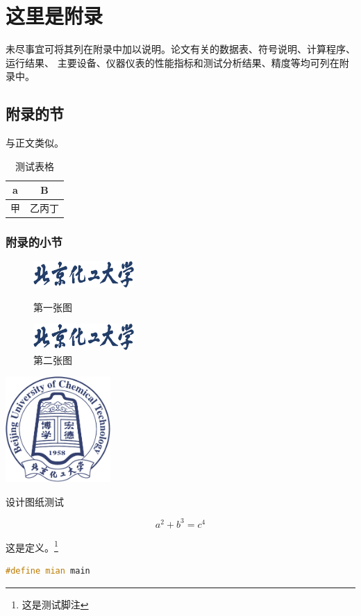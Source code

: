\chapter{这里是附录}\label{app:1}
未尽事宜可将其列在附录中加以说明。论文有关的数据表、符号说明、计算程序、运行结果、
主要设备、仪器仪表的性能指标和测试分析结果、精度等均可列在附录中。
\section{附录的节}
与正文类似。
\begin{table}[ht]
	\centering
	\caption{测试表格}\label{tab:mytable}
	\begin{tabular}{cc}
		\toprule
		a & B   \\
		\midrule
		甲   & 乙丙丁 \\
		\bottomrule
	\end{tabular}
\end{table}

\subsection{附录的小节}
\zhlipsum[1][name = zhufu]

\begin{figure}[ht]
	\centering
	\begin{minipage}{0.3\textwidth}
		\centering
		\includegraphics[height=1cm]{figure/ZNName.png}
		\caption{第一张图}\label{fig:test1}
	\end{minipage}
	\hspace{2cm}
	\begin{minipage}{0.3\textwidth}
		\centering
		\includegraphics[height=1cm]{figure/ZNName.png}
		\caption{第二张图}\label{fig:test2}
	\end{minipage}
\end{figure}

\zhlipsum[name = xiangyu]

\begin{dfigure}[tbp]
	\centering\includegraphics[width=4cm]{figure/Logo.pdf}
	\caption{设计图纸测试}
\end{dfigure}

\zhlipsum[1][name = aspirin]

\begin{equation}
	a^2+b^3=c^4
\end{equation}

\begin{definition}
	这是定义。\footnote{这是测试脚注}
\end{definition}

\begin{lstlisting}[language=c++,caption=一个测试,label=mycode]
#define mian main
	\end{lstlisting}

